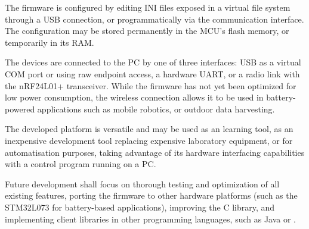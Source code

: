 The firmware is configured by editing INI files exposed in a virtual file system through a \gls{USB} connection, or programmatically via the communication interface. The configuration may be stored permanently in the \gls{MCU}'s flash memory, or temporarily in its \gls{RAM}.

The devices are connected to the \gls{PC} by one of three interfaces: \gls{USB} as a virtual COM port or using raw endpoint access, a hardware \gls{UART}, or a radio link with the nRF24L01+ transceiver. While the firmware has not yet been optimized for low power consumption, the wireless connection allows it to be used in battery-powered applications such as mobile robotics, or outdoor data harvesting.

The developed platform is versatile and may be used as an learning tool, as an inexpensive development tool replacing expensive laboratory equipment, or for automatisation purposes, taking advantage of its hardware interfacing capabilities with a control program running on a PC.

Future development shall focus on thorough testing and optimization of all existing features, porting the firmware to other hardware platforms (such as the STM32L073 for battery-based applications), improving the C library, and implementing client libraries in other programming languages, such as Java or \CS.

